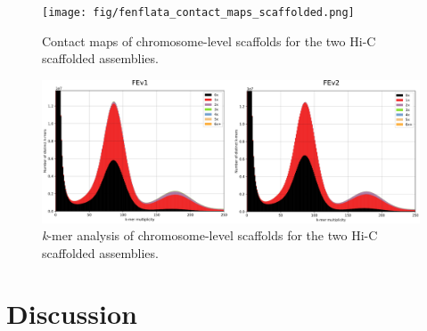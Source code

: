 \begin{figure}[H]
    \centering
    \texttt{[image: fig/fenflata\_contact\_maps\_scaffolded.png]}
    \caption{Contact maps of chromosome-level scaffolds for the two Hi-C scaffolded assemblies.}
    \label{fig:fenflata_contact_maps}
\end{figure}

\begin{figure}[H]
    \centering
    \includegraphics[width=1\linewidth]{fig/fenflata_kat_scaffolded.eps}
    \caption{\textit{k}-mer analysis of chromosome-level scaffolds for the two Hi-C scaffolded assemblies.}
    \label{fig:fenflata_kat_comp}
\end{figure}

\section{Discussion}

